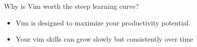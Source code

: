 \documentclass{beamer}
\begin{document}
    \begin{frame}{Why is Vim worth the steep learning curve?}
        \begin{itemize}
            \item <alert@+> Vim is designed to maximize your productivity potential.
            \item <alert@+> Your vim skills can grow slowly but consistently over time
        \end{itemize}
    \end{frame}
\end{document}
